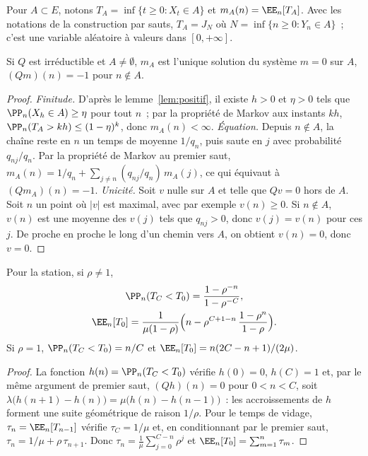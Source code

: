 Pour $A\subset E$, notons $T_A=\inf\{t\geq0:X_t\in A\}$ et $m_A(n)=\EE_n[T_A]$. Avec les notations de la construction par sauts, $T_A=J_N$ où $N=\inf\{n\geq0:Y_n\in A\}$~; c'est une variable aléatoire à valeurs dans $[0,+\infty]$.

\begin{proposition}\label{prop:atteinte}
Si $Q$ est irréductible et $A\neq\emptyset$, $m_A$ est l'unique solution du système $m=0$ sur $A$, $(Qm)(n)=-1$ pour $n\notin A$.
\end{proposition}

\begin{proof}
\emph{Finitude.} D'après le lemme~\ref{lem:positif}, il existe $h>0$ et $\eta>0$ tels que $\PP_n(X_h\in A)\geq\eta$ pour tout $n$~; par la propriété de Markov aux instants $kh$, $\PP_n(T_A>kh)\leq(1-\eta)^k$, donc $m_A(n)<\infty$.
\emph{Équation.} Depuis $n\notin A$, la chaîne reste en $n$ un temps de moyenne $1/q_n$, puis saute en $j$ avec probabilité $q_{nj}/q_n$. Par la propriété de Markov au premier saut, $m_A(n)=1/q_n+\sum_{j\neq n}(q_{nj}/q_n)\,m_A(j)$, ce qui équivaut à $(Qm_A)(n)=-1$.
\emph{Unicité.} Soit $v$ nulle sur $A$ et telle que $Qv=0$ hors de $A$. Soit $n$ un point où $|v|$ est maximal, avec par exemple $v(n)\geq0$. Si $n\notin A$, $v(n)$ est une moyenne des $v(j)$ tels que $q_{nj}>0$, donc $v(j)=v(n)$ pour ces $j$. De proche en proche le long d'un chemin vers $A$, on obtient $v(n)=0$, donc $v=0$.
\end{proof}

\begin{corollaire}\label{cor:ruine}
Pour la station, si $\rho\neq1$,
\begin{gather*}
\PP_n(T_C<T_0)=\frac{1-\rho^{-n}}{1-\rho^{-C}},\\
\EE_n[T_0]=\frac{1}{\mu(1-\rho)}\Big(n-\rho^{C+1-n}\,\frac{1-\rho^n}{1-\rho}\Big).
\end{gather*}
Si $\rho=1$, $\PP_n(T_C<T_0)=n/C$ et $\EE_n[T_0]=n(2C-n+1)/(2\mu)$.
\end{corollaire}

\begin{proof}
La fonction $h(n)=\PP_n(T_C<T_0)$ vérifie $h(0)=0$, $h(C)=1$ et, par le même argument de premier saut, $(Qh)(n)=0$ pour $0<n<C$, soit $\lambda\big(h(n+1)-h(n)\big)=\mu\big(h(n)-h(n-1)\big)$~: les accroissements de $h$ forment une suite géométrique de raison $1/\rho$. Pour le temps de vidage, $\tau_n=\EE_n[T_{n-1}]$ vérifie $\tau_C=1/\mu$ et, en conditionnant par le premier saut, $\tau_n=1/\mu+\rho\,\tau_{n+1}$. Donc $\tau_n=\frac1\mu\sum_{j=0}^{C-n}\rho^j$ et $\EE_n[T_0]=\sum_{m=1}^n\tau_m$.
\end{proof}

